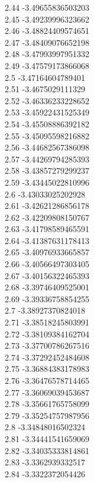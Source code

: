 {2.44	-3.49655836503203\\
2.45	-3.49239996323662\\
2.46	-3.48824409574651\\
2.47	-3.48409076652198\\
2.48	-3.47993997951332\\
2.49	-3.47579173866068\\
2.5	-3.47164604789401\\
2.51	-3.4675029111329\\
2.52	-3.46336233228652\\
2.53	-3.45922431525349\\
2.54	-3.45508886392182\\
2.55	-3.45095598216882\\
2.56	-3.44682567386098\\
2.57	-3.44269794285393\\
2.58	-3.43857279299237\\
2.59	-3.43445022810996\\
2.6	-3.43033025202928\\
2.61	-3.42621286856178\\
2.62	-3.42209808150767\\
2.63	-3.41798589465591\\
2.64	-3.41387631178413\\
2.65	-3.40976933665857\\
2.66	-3.40566497303405\\
2.67	-3.40156322465393\\
2.68	-3.39746409525001\\
2.69	-3.39336758854255\\
2.7	-3.38927370824018\\
2.71	-3.38518245803991\\
2.72	-3.38109384162704\\
2.73	-3.37700786267516\\
2.74	-3.37292452484608\\
2.75	-3.36884383178983\\
2.76	-3.36476578714465\\
2.77	-3.36069039453687\\
2.78	-3.35661765758099\\
2.79	-3.35254757987956\\
2.8	-3.34848016502324\\
2.81	-3.34441541659069\\
2.82	-3.34035333814861\\
2.83	-3.3362939332517\\
2.84	-3.3322372054426\\
}
